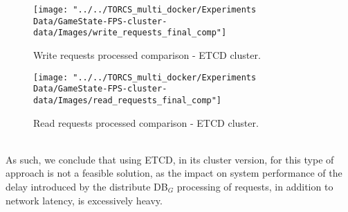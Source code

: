 \begin{figure}[h!]
	\centering
	\texttt{[image: "../../TORCS\_multi\_docker/Experiments Data/GameState-FPS-cluster-data/Images/write\_requests\_final\_comp"]}
	\caption[Write requests processed comparison - ETCD cluster]{Write requests processed comparison - ETCD cluster.}
	\label{fig:write-requests-comparison-etcd-cluster}
\end{figure}
\begin{figure}[h!]
	\centering
	\texttt{[image: "../../TORCS\_multi\_docker/Experiments Data/GameState-FPS-cluster-data/Images/read\_requests\_final\_comp"]}
	\caption[Read requests processed comparison - ETCD cluster]{Read requests processed comparison - ETCD cluster.}
	\label{fig:read-requests-comparison-etcd-cluster}
\end{figure}
\\ As such, we conclude that using ETCD, in its cluster version, for this type of approach is not a feasible solution, as the impact on system performance of the delay introduced by the distribute DB$_G$ processing of requests, in addition to network latency, is excessively heavy.

